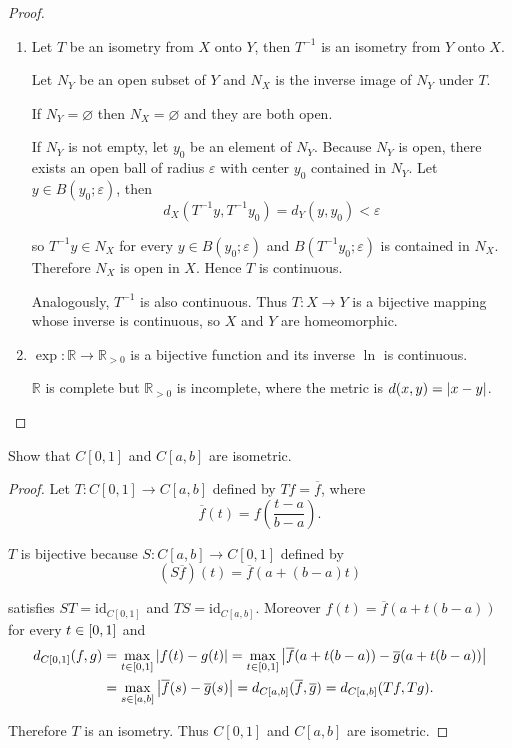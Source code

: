 \begin{proof}
    \begin{enumerate}[label={(\alph*)}]
        \item Let $T$ be an isometry from $X$ onto $Y$, then $T^{-1}$ is an isometry from $Y$ onto $X$.

              Let $N_{Y}$ be an open subset of $Y$ and $N_{X}$ is the inverse image of $N_{Y}$ under $T$.

              If $N_{Y} = \varnothing$ then $N_{X} = \varnothing$ and they are both open.

              If $N_{Y}$ is not empty, let $y_{0}$ be an element of $N_{Y}$. Because $N_{Y}$ is open, there exists an open ball of radius $\varepsilon$ with center $y_{0}$ contained in $N_{Y}$. Let $y\in B(y_{0}; \varepsilon)$, then
              \[
                  d_{X}(T^{-1}y, T^{-1}y_{0}) = d_{Y}(y, y_{0}) < \varepsilon
              \]

              so $T^{-1}y\in N_{X}$ for every $y\in B(y_{0}; \varepsilon)$ and $B(T^{-1}y_{0}; \varepsilon)$ is contained in $N_{X}$. Therefore $N_{X}$ is open in $X$. Hence $T$ is continuous.

              Analogously, $T^{-1}$ is also continuous. Thus $T: X\to Y$ is a bijective mapping whose inverse is continuous, so $X$ and $Y$ are homeomorphic.
        \item $\exp: \mathbb{R}\to \mathbb{R}_{>0}$ is a bijective function and its inverse $\ln$ is continuous.

              $\mathbb{R}$ is complete but $\mathbb{R}_{>0}$ is incomplete, where the metric is $d(x, y) = \left\vert{x - y}\right\vert$.
    \end{enumerate}
\end{proof}

\begin{exercise}\label{chapter1:section6:exercise6}
    Show that $C[0, 1]$ and $C[a, b]$ are isometric.
\end{exercise}

\begin{proof}
    Let $T: C[0, 1]\to C[a, b]$ defined by $Tf = \overline{f}$, where
    \[
        \overline{f}(t) = f\left(\frac{t - a}{b - a}\right).
    \]

    $T$ is bijective because $S: C[a, b]\to C[0, 1]$ defined by
    \[
        (S\overline{f})(t) = \overline{f}(a + (b - a)t)
    \]

    satisfies $ST = \text{id}_{C[0,1]}$ and $TS = \text{id}_{C[a,b]}$. Moreover $f(t) = \overline{f}(a + t(b - a))$ for every $t\in \left[{0, 1}\right]$ and
    \begin{align*}
        d_{C[0,1]}(f, g) & = \max_{t\in[0,1]}\left\vert{f(t) - g(t)}\right\vert = \max_{t\in [0,1]}\left\vert{\overline{f}(a + t(b - a)) - \overline{g}(a + t(b - a))}\right\vert         \\
                         & = \max_{s\in [a, b]}\left\vert{\overline{f}(s) - \overline{g}(s)}\right\vert = d_{C[a, b]}(\overline{f}, \overline{g}) = d_{C[a, b]}(Tf, Tg).
    \end{align*}

    Therefore $T$ is an isometry. Thus $C[0,1]$ and $C[a,b]$ are isometric.
\end{proof}

